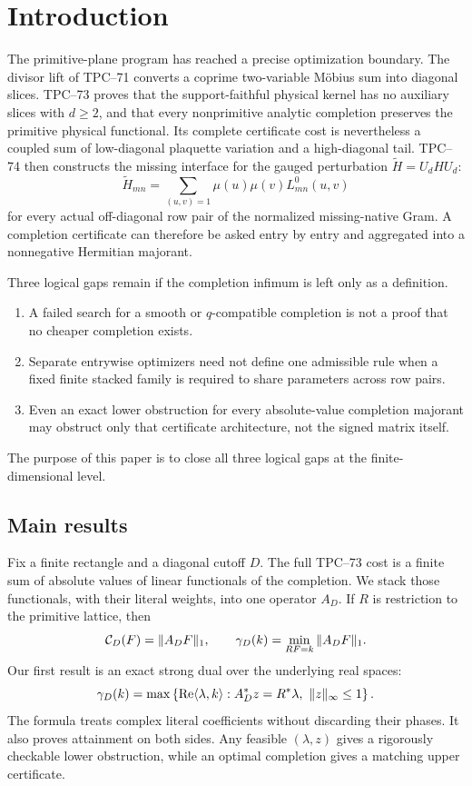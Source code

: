 \section{Introduction}
\label{sec:introduction}

The primitive-plane program has reached a precise optimization boundary.
The divisor lift of TPC--71 \citep{WangTPC71} converts a coprime
two-variable M\"obius sum into diagonal slices.  TPC--73
\citep{WangTPC73} proves that the support-faithful physical kernel has no
auxiliary slices with \(d\ge2\), and that every nonprimitive analytic
completion preserves the primitive physical functional.  Its complete
certificate cost is nevertheless a coupled sum of low-diagonal
plaquette variation and a high-diagonal tail.  TPC--74
\citep{WangTPC74} then constructs the missing interface for the gauged
perturbation \(\widetilde H=U_dHU_d\):
\[
 \widetilde H_{mn}
 =
 \sum_{(u,v)=1}\mu(u)\mu(v)L_{mn}^{0}(u,v)
\]
for every actual off-diagonal row pair of the normalized missing-native
Gram.  A completion certificate can therefore be asked entry by entry
and aggregated into a nonnegative Hermitian majorant.

Three logical gaps remain if the completion infimum is left only as a
definition.
\begin{enumerate}[label=\textup{(\roman*)},leftmargin=2.7em]
 \item A failed search for a smooth or \(q\)-compatible completion is not
       a proof that no cheaper completion exists.
 \item Separate entrywise optimizers need not define one admissible rule
       when a fixed finite stacked family is required to share parameters
       across row pairs.
 \item Even an exact lower obstruction for every absolute-value
       completion majorant may obstruct only that certificate
       architecture, not the signed matrix itself.
\end{enumerate}
The purpose of this paper is to close all three logical gaps at the
finite-dimensional level.

\subsection{Main results}

Fix a finite rectangle and a diagonal cutoff \(D\).  The full TPC--73
cost is a finite sum of absolute values of linear functionals of the
completion.  We stack those functionals, with their literal weights, into
one operator \(A_D\).  If \(R\) is restriction to the primitive lattice,
then
\[
 \mathcal C_D(F)=\|A_DF\|_1,
 \qquad
 \gamma_D(k)=\min_{RF=k}\|A_DF\|_1.
\]
Our first result is an exact strong dual over the underlying real spaces:
\[
 \gamma_D(k)
 =
 \max
 \left\{
 \operatorname{Re}\langle\lambda,k\rangle:
 A_D^*z=R^*\lambda,\ \|z\|_\infty\le1
 \right\}.
\]
The formula treats complex literal coefficients without discarding their
phases.  It also proves attainment on both sides.  Any feasible
\((\lambda,z)\) gives a rigorously checkable lower obstruction, while an
optimal completion gives a matching upper certificate.

